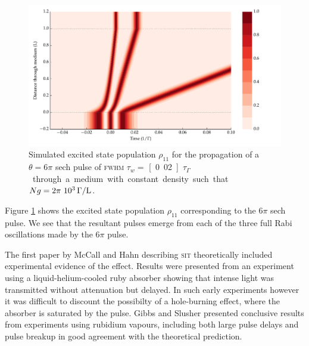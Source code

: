     \begin{figure}[]
      \includegraphics[width=\linewidth]
        {figs/03_nonlinear/coh_sech_6_0pi_fwhm0_020_Ng01000_fig3.pdf}
      \caption{
        Simulated excited state population $\rho_{11}$ for the propagation of a
        $\theta = 6\pi$ sech pulse of \textsc{fwhm} $\tau_w = $
        \unit[0.02]{$\tau_\Gamma$} through a medium with constant density such
        that $Ng = \unit[2\pi~10^3]{\Gamma/L}$.
      }
      \label{fig:sit_6pi_pop}
    \end{figure}

    Figure \ref{fig:sit_6pi_pop} shows the excited state population $\rho_{11}$
    corresponding to the $6\pi$ sech pulse. We see that the resultant pulses
    emerge from each of the three full Rabi oscillations made by the $6\pi$
    pulse.

    The first paper by McCall and Hahn describing \textsc{sit} theoretically
    included experimental evidence of the effect.\cite{McCall1969} Results were
    presented from an experiment using a liquid-helium-cooled ruby absorber
    showing that intense light was transmitted without attenuation but delayed.
    In such early experiments however it was difficult to discount the
    possibilty of a hole-burning effect, where the absorber is saturated by the
    pulse. Gibbs and Slusher presented conclusive results from experiments using
    rubidium vapours,\cite{Slusher1972} including both large pulse delays and
    pulse breakup in good agreement with the theoretical prediction.
